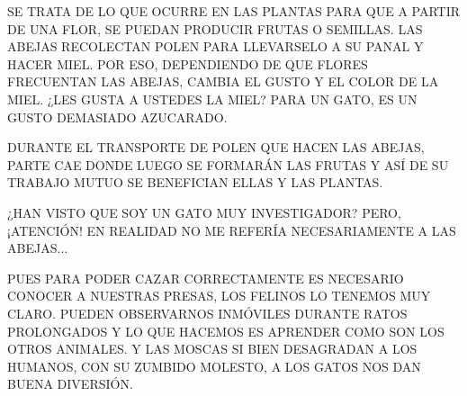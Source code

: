 SE TRATA DE LO QUE OCURRE EN LAS PLANTAS PARA QUE A PARTIR DE UNA FLOR, SE PUEDAN PRODUCIR FRUTAS O SEMILLAS. LAS ABEJAS RECOLECTAN POLEN PARA LLEVARSELO A SU PANAL Y HACER MIEL.  POR ESO, DEPENDIENDO DE QUE FLORES FRECUENTAN LAS ABEJAS, CAMBIA EL GUSTO Y EL COLOR DE LA MIEL. ¿LES GUSTA A USTEDES LA MIEL? PARA UN GATO, ES UN GUSTO DEMASIADO AZUCARADO. 

DURANTE EL TRANSPORTE DE POLEN QUE HACEN LAS ABEJAS, PARTE CAE DONDE LUEGO SE FORMARÁN LAS FRUTAS Y ASÍ DE SU TRABAJO MUTUO SE BENEFICIAN ELLAS Y LAS PLANTAS.	

¿HAN VISTO QUE SOY UN GATO MUY INVESTIGADOR?
PERO, ¡ATENCIÓN! EN REALIDAD NO ME REFERÍA NECESARIAMENTE A LAS ABEJAS$\ldots$





\newpage
{}
\newpage
{} 


PUES PARA PODER CAZAR CORRECTAMENTE ES NECESARIO CONOCER A NUESTRAS PRESAS, LOS FELINOS LO TENEMOS MUY CLARO. PUEDEN OBSERVARNOS INMÓVILES DURANTE RATOS PROLONGADOS Y LO QUE HACEMOS ES APRENDER COMO SON LOS OTROS ANIMALES. Y LAS MOSCAS SI BIEN DESAGRADAN A LOS HUMANOS, CON SU ZUMBIDO MOLESTO, A LOS GATOS NOS DAN BUENA DIVERSIÓN. 

